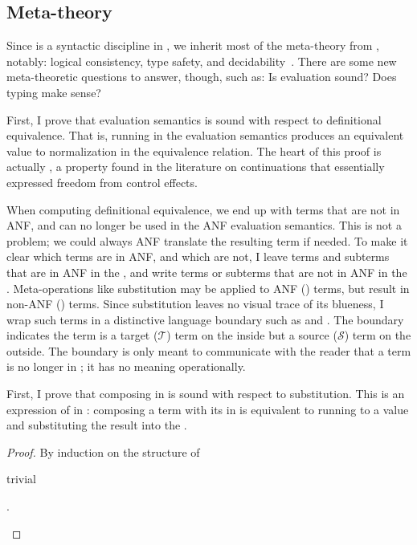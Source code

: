 \subsection{Meta-theory}
{
\allowdisplaybreaks %
Since \tlang is a syntactic discipline in \slang, we inherit most of the
meta-theory from \slang, notably: logical consistency, type safety, and
decidability~\cite{luo1989,severi1994:dpts}.
There are some new meta-theoretic questions to answer, though, such as: Is
 evaluation sound? Does  typing make sense?

First, I prove that  evaluation semantics is sound with respect to
definitional equivalence.
That is, running in the  evaluation semantics produces an equivalent
value to normalization in the equivalence relation.
The heart of this proof is actually \emph{}, a property found
in the literature on continuations that essentially expressed freedom from
control effects.

When computing definitional equivalence, we end up with terms that are not in
ANF, and can no longer be used in the ANF evaluation semantics.
This is not a problem; we could always ANF translate the resulting term if needed.
To make it clear which terms are in ANF, and which are not, I leave terms and subterms that are
in ANF in the , and write terms or subterms that are not in ANF
in the .
Meta-operations like substitution may be applied to ANF () terms,
but result in non-ANF () terms.
Since substitution leaves no visual trace of its blueness, I wrap such terms in
a distinctive language boundary such as \im{\sbound{\subst{\tM}{\tMpr}{\tx}}}
and \im{\sbound{\tK\hw{\tM}}}.
The boundary indicates the term is a target (\(\mathcal{T}\)) term on the inside
but a source (\(\mathcal{S}\)) term on the outside.
The boundary is only meant to communicate with the reader that a term is no
longer in ; it has no meaning operationally.

First, I prove that composing  in  is sound with
respect to substitution.
This is an expression of  in : composing a term
\im{\tM} with its  \im{\tK} in  is equivalent to running
\im{\tM} to a value and substituting the result into the  \im{\tK}.
\begin{lemma}[Naturality]
  \label{lem:anf:tgt:het-sound}
  \im{\tK\hhw{\tM} \equiv \sbound{\tK\hw{\tM}}}
\end{lemma}
\begin{proof}
  By induction on the structure of \im{\tM}
  \begin{proofcases}
    \item \im{\tM = \tN} trivial
    \item \im{\tM = \tlete{\tx}{\tNpr}{\tMpr}}.


\end{proofcases}
\end{proof}}
